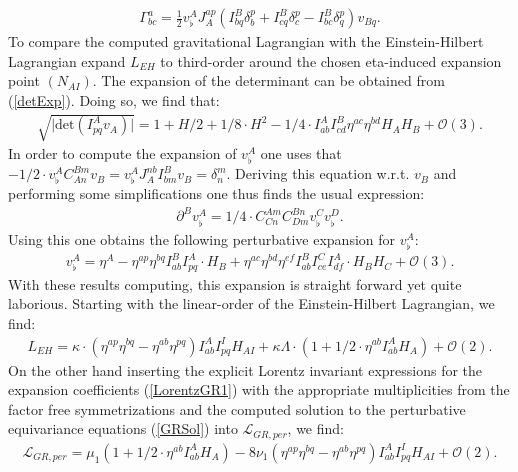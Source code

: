 \begin{align}
\Gamma^a_{bc} = \frac{1}{2} v_{\flat}^A J_A^{ap} \left ( I^B_{bq}\delta^p_b + I^B_{cq}\delta^p_c - I^B_{bc}\delta^p_q  \right ) v_{Bq}.
\end{align}
To compare the computed gravitational Lagrangian with the Einstein-Hilbert Lagrangian expand $L_{EH}$ to third-order around the chosen eta-induced expansion point $(N_{AI})$. The expansion of the determinant can be obtained from (\ref{detExp}). Doing so, we find that:
\begin{align}
   \sqrt{\vert \mathrm{det} \left ( I^A_{pq}v_A \right ) \vert } = 1 + H/2 +1/8 \cdot H^2 - 1/4 \cdot I^A_{ab}I^B_{cd} \eta^{ac} \eta^{bd} H_A H_B + \mathcal{O}(3).   
\end{align}
In order to compute the expansion of $v^A_{\flat}$ one uses that $-1/2 \cdot v_{\flat}^AC_{An}^{Bm}v_B = v_{\flat}^A J_A^{nb}I^B_{bm}v_B = \delta^m_n$. Deriving this equation w.r.t. $v_B$ and performing some simplifications one thus finds the usual expression:
\begin{align}
    \partial^Bv_{\flat}^A = 1/4 \cdot C_{Cn}^{Am}C_{Dm}^{Bn}v_{\flat}^C v_{\flat}^{D}.
\end{align}
Using this one obtains the following perturbative expansion for $v_{\flat}^A$:
\begin{align}
    v_{\flat}^A = \eta^A - \eta^{ap}\eta^{bq} I^B_{ab} I^A_{pq} \cdot H_B + \eta^{ac}\eta^{bd}\eta^{ef} I^B_{ab} I^C_{ce} I^A_{df} \cdot H_BH_C + \mathcal{O}(3).  
\end{align}
With these results computing, this expansion is straight forward yet quite laborious.
Starting with the linear-order of the Einstein-Hilbert Lagrangian, we find:
\begin{align}
        L_{EH} = \kappa \cdot (\eta^{ap}\eta^{bq} - \eta^{ab}\eta^{pq}) I^{A}_{ab}I^{I}_{pq} H_{AI} + \kappa \Lambda \cdot (1 + 1/2 \cdot \eta^{ab} I_{ab}^A H_A) + \mathcal{O}(2).
\end{align}
On the other hand inserting the explicit Lorentz invariant expressions for the expansion coefficients (\ref{LorentzGR1}) with the appropriate multiplicities from the factor free symmetrizations and the computed solution to the perturbative equivariance equations (\ref{GRSol}) into $\mathcal{L}_{GR,per}$, we find:
\begin{align}
    \mathcal{L}_{GR,per} = \mu_1(1 + 1/2 \cdot \eta^{ab} I_{ab}^A H_A) - 8 \nu_1 \left(\eta^{ap}\eta^{bq} - \eta^{ab}\eta^{pq} \right )I^{A}_{ab}I^{I}_{pq} H_{AI} + \mathcal{O}(2).
\end{align}
